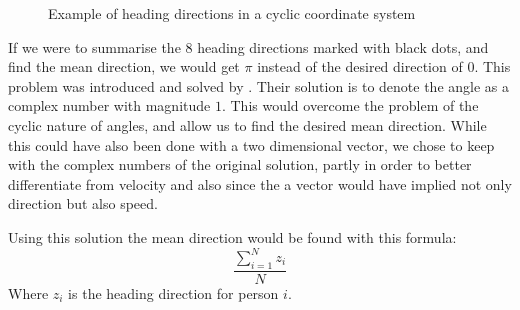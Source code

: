 \begin{figure}\centering
{}
\caption{Example of heading directions in a cyclic coordinate system}
\label{fig:radiansHeadingdirection}
\end{figure}

If we were to summarise the 8 heading directions marked with black dots, and find the mean direction, we would get $\pi$ instead of the desired direction of $0$. This problem was introduced and solved by \citet{localTrendStatistics}. Their solution is to denote the angle as a complex number with magnitude $1$. This would overcome the problem of the cyclic nature of angles, and allow us to find the desired mean direction. While this could have also been done with a two dimensional vector, we chose to keep with the complex numbers of the original solution, partly in order to better differentiate from velocity and also since the a vector would have implied not only direction but also speed.

Using this solution the mean direction would be found with this formula: $$\frac{\sum_{i=1}^{N} z_i}{N}$$ Where $z_i$ is the heading direction for person $i$.

